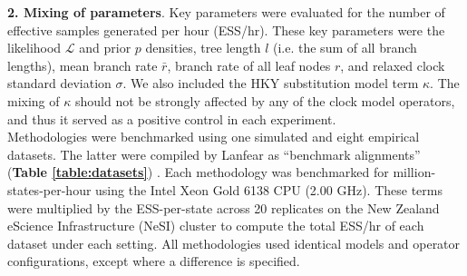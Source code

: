 \documentclass[10pt,letterpaper]{article}
\begin{document}
\textbf{2. Mixing of parameters}. Key parameters were evaluated for the number of effective samples generated per hour (ESS/hr).
These key parameters were the likelihood $\mathcal{L}$ and prior $p$ densities,  tree length $l$ (i.e. the sum of all branch lengths), mean branch rate $\bar{r}$, branch rate of all leaf nodes $r$, and relaxed clock standard deviation $\sigma$.
We also included the HKY substitution model term $\kappa$. 
The mixing of $\kappa$ should not be strongly affected by any of the clock model operators, and thus it served as a positive control in each experiment. \\




Methodologies were benchmarked using one simulated and eight empirical datasets.
The latter were compiled by Lanfear as ``benchmark alignments'' (\textbf{Table \ref{table:datasets}}) \cite{lanfear2019Github, lanfear2016partitionfinder}.
Each methodology was benchmarked for million-states-per-hour using the Intel Xeon Gold 6138 CPU (2.00 GHz).
These terms were multiplied by the ESS-per-state across 20 replicates on the New Zealand eScience Infrastructure (NeSI) cluster to compute the total ESS/hr of each dataset under each setting.
All methodologies used identical models and operator configurations, except where a difference is specified.


\end{document}
